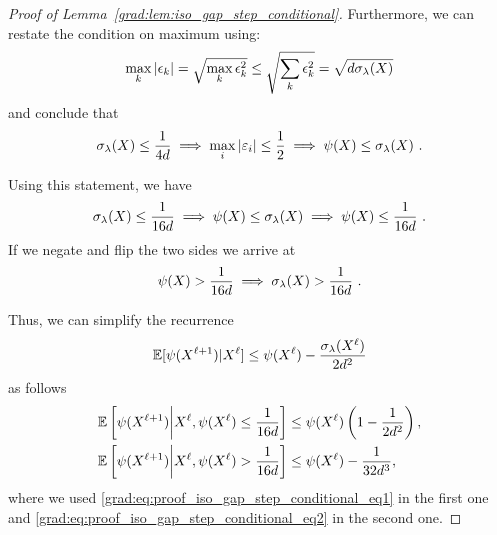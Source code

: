 \begin{proof}[Proof of Lemma~\ref{grad:lem:iso_gap_step_conditional}]
Furthermore, we can restate the condition on maximum using: 
\begin{align}
\max_k|\epsilon_k| = \sqrt{\max_k\epsilon_k^2} \le \sqrt{\sum_k\epsilon_k^2} = \sqrt{d\sigma_\lambda(X)}
\end{align}
and conclude that 
\begin{align}
\sigma_\lambda(X) \le \frac{1}{4d} \implies  \max_i |{\varepsilon}_i|\le \frac12\implies \psi(X)\le \sigma_\lambda(X)~.
\end{align}

Using this statement, we have 
\begin{align}
    \sigma_\lambda(X) \leq \frac{1}{16d} \implies \psi(X)\le \sigma_\lambda(X) \implies \psi(X) \leq \frac{1}{16d}~.
\end{align}
If we negate and flip the two sides we arrive at 
\begin{equation}
\label{grad:eq:proof_iso_gap_step_conditional_eq2}
   \psi(X) > \frac{1}{16d} \implies \sigma_\lambda(X) > \frac{1}{16d}~.
\end{equation}

Thus, we can simplify the recurrence 
\begin{align}
    \mathbb{E}[\psi(X^{\ell+1}) | X^\ell] \le \psi(X^\ell) - \frac{\sigma_\lambda(X^\ell)}{2d^2} 
\end{align}
as follows
\begin{align}
\mathbb{E}\left[\psi(X^{\ell+1}) \middle| X^\ell, \psi(X^\ell) \le \frac{1}{16d}\right] &\le \psi(X^\ell)\left(1-\frac{1}{2d^2}\right),\\
\mathbb{E}\left[\psi(X^{\ell+1}) \middle| X^\ell, \psi(X^\ell) > \frac{1}{16d}\right] &\le \psi(X^\ell) - \frac{1}{32d^3},
\end{align}
where we used \eqref{grad:eq:proof_iso_gap_step_conditional_eq1} in the first one and \eqref{grad:eq:proof_iso_gap_step_conditional_eq2} in the second one.
\end{proof}

